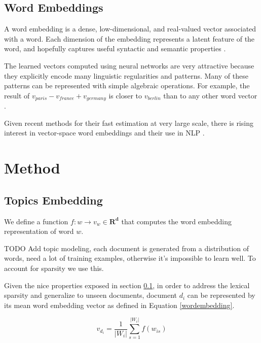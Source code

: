 \documentclass{article}
\begin{document}
\subsection{Word Embeddings}
\label{emb}

A word embedding is a dense, low-dimensional, and real-valued vector associated with a word. Each dimension of the embedding represents a latent feature of the word, and hopefully captures useful syntactic and semantic properties \cite{Turian10wordrepresentations}.

The learned vectors computed using neural networks are very attractive because they explicitly encode many linguistic regularities and patterns. Many of these patterns can be represented with simple algebraic operations. For example, the result of $v_{paris} - v_{france} + v_{germany}$ is closer to $v_{berlin}$ than to any other word vector \cite{mikolovChen,mikolovYih}.

Given recent methods for their fast estimation at very large scale, there is rising interest in vector-space word embeddings and their use in NLP \cite{Arvind14}.

\section{Method}
\label{approach}

\subsection{Topics Embedding}
\label{docwordemb}

We define a function $f : w \rightarrow v_w \in \mathbf{R^d}$ that computes the word embedding representation of word $w$.

TODO Add topic modeling, each document is generated from a distribution of words, need a lot of training examples, otherwise it's impossible to learn well. To account for sparsity we use this.

Given the nice properties exposed in section \ref{emb}, in order to address the lexical sparsity and generalize to unseen documents, document $d_i$ can be represented by its mean word embedding vector as defined in Equation \ref{wordembedding}.

\begin{equation}
\label{wordembedding}
v_{d_i} = \frac{1}{|W_i|} \sum_{s=1}^{|W_i|}{f(w_{is})}
\end{equation}

\end{document}
